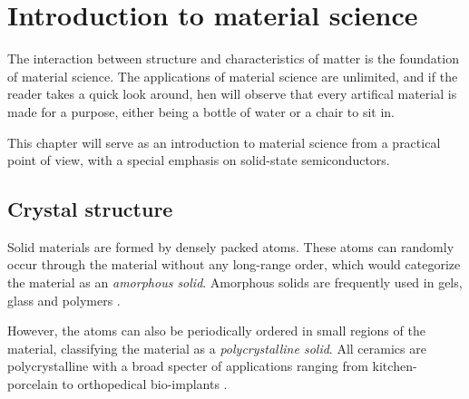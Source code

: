 \chapter{Introduction to material science}

The interaction between structure and characteristics of matter is the foundation of material science. The applications of material science are unlimited, and if the reader takes a quick look around, hen will observe that every artifical material is made for a purpose, either being a bottle of water or a chair to sit in.

This chapter will serve as an introduction to material science from a practical point of view, with a special emphasis on solid-state semiconductors.

\section{Crystal structure}


Solid materials are formed by densely packed atoms. These atoms can randomly occur through the material without any long-range order, which would categorize the material as an \textit{amorphous solid}. Amorphous solids are frequently used in gels, glass and polymers \cite{BenStreetman2015}.

However, the atoms can also be periodically ordered in small regions of the material, classifying the material as a \textit{polycrystalline solid}. All ceramics are polycrystalline with a broad specter of applications ranging from kitchen-porcelain to orthopedical bio-implants \cite{Renganathan2018}.

